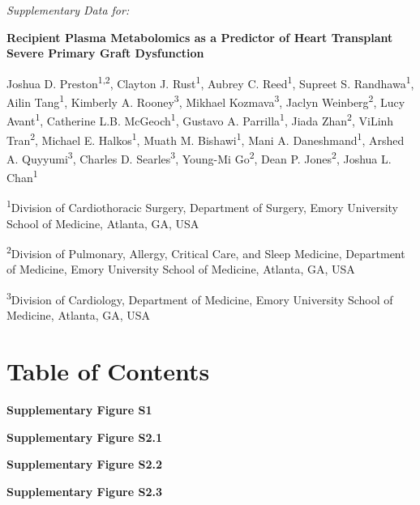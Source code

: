\documentclass[
]{article}
\author{}
\date{\vspace{-2.5em}}
\begin{document}
\begin{center}
\textit{\Large Supplementary Data for:}
\end{center}

\begin{center}
\textbf{\Large Recipient Plasma Metabolomics as a Predictor of Heart Transplant Severe Primary Graft Dysfunction}
\end{center}

\vspace{1em}

Joshua D. Preston\textsuperscript{1,2}, Clayton J.
Rust\textsuperscript{1}, Aubrey C. Reed\textsuperscript{1}, Supreet S.
Randhawa\textsuperscript{1}, Ailin Tang\textsuperscript{1}, Kimberly A.
Rooney\textsuperscript{3}, Mikhael Kozmava\textsuperscript{3}, Jaclyn
Weinberg\textsuperscript{2}, Lucy Avant\textsuperscript{1}, Catherine
L.B. McGeoch\textsuperscript{1}, Gustavo A. Parrilla\textsuperscript{1},
Jiada Zhan\textsuperscript{2}, ViLinh Tran\textsuperscript{2}, Michael
E. Halkos\textsuperscript{1}, Muath M. Bishawi\textsuperscript{1}, Mani
A. Daneshmand\textsuperscript{1}, Arshed A. Quyyumi\textsuperscript{3},
Charles D. Searles\textsuperscript{3}, Young-Mi Go\textsuperscript{2},
Dean P. Jones\textsuperscript{2}, Joshua L. Chan\textsuperscript{1}

\vspace{1em}

\textsuperscript{1}Division of Cardiothoracic Surgery, Department of
Surgery, Emory University School of Medicine, Atlanta, GA, USA

\textsuperscript{2}Division of Pulmonary, Allergy, Critical Care, and
Sleep Medicine, Department of Medicine, Emory University School of
Medicine, Atlanta, GA, USA

\textsuperscript{3}Division of Cardiology, Department of Medicine, Emory
University School of Medicine, Atlanta, GA, USA

\vfill

\section{Table of Contents}\label{table-of-contents}

\textbf{Supplementary Figure S1} 

\textbf{Supplementary Figure S2.1} 

\textbf{Supplementary Figure S2.2} 

\textbf{Supplementary Figure S2.3} 
\end{document}
